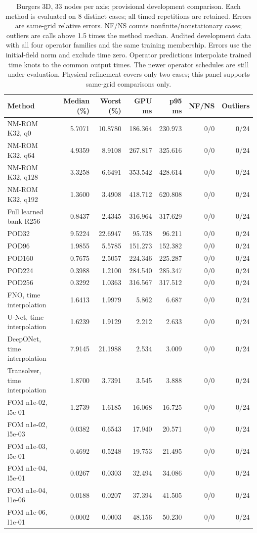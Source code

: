 \begin{table}[htbp]
\centering
\small
\setlength{\tabcolsep}{3pt}
\begin{tabular}{lrrrrrr}
\toprule
Method & Median (\%) & Worst (\%) & GPU ms & p95 ms & NF/NS & Outliers \\
\midrule
NM-ROM K32, q0 & 5.7071 & 10.8780 & 186.364 & 230.973 & 0/0 & 0/24 \\
NM-ROM K32, q64 & 4.9359 & 8.9108 & 267.817 & 325.616 & 0/0 & 0/24 \\
NM-ROM K32, q128 & 3.3258 & 6.6491 & 353.542 & 428.614 & 0/0 & 0/24 \\
NM-ROM K32, q192 & 1.3600 & 3.4908 & 418.712 & 620.808 & 0/0 & 0/24 \\
Full learned bank R256 & 0.8437 & 2.4345 & 316.964 & 317.629 & 0/0 & 0/24 \\
POD32 & 9.5224 & 22.6947 & 95.738 & 96.211 & 0/0 & 0/24 \\
POD96 & 1.9855 & 5.5785 & 151.273 & 152.382 & 0/0 & 0/24 \\
POD160 & 0.7675 & 2.5057 & 224.346 & 225.287 & 0/0 & 0/24 \\
POD224 & 0.3988 & 1.2100 & 284.540 & 285.347 & 0/0 & 0/24 \\
POD256 & 0.3292 & 1.0363 & 316.567 & 317.512 & 0/0 & 0/24 \\
FNO, time interpolation & 1.6413 & 1.9979 & 5.862 & 6.687 & 0/0 & 0/24 \\
U-Net, time interpolation & 1.6239 & 1.9129 & 2.212 & 2.633 & 0/0 & 0/24 \\
DeepONet, time interpolation & 7.9145 & 21.1988 & 2.534 & 3.009 & 0/0 & 0/24 \\
Transolver, time interpolation & 1.8700 & 3.7391 & 3.545 & 3.888 & 0/0 & 0/24 \\
FOM n1e-02, l5e-01 & 1.2739 & 1.6185 & 16.068 & 16.725 & 0/0 & 0/24 \\
FOM n1e-02, l5e-03 & 0.0382 & 0.6543 & 17.940 & 20.571 & 0/0 & 0/24 \\
FOM n1e-03, l5e-01 & 0.4692 & 0.5248 & 19.753 & 21.495 & 0/0 & 0/24 \\
FOM n1e-04, l5e-01 & 0.0267 & 0.0303 & 32.494 & 34.086 & 0/0 & 0/24 \\
FOM n1e-04, l1e-06 & 0.0188 & 0.0207 & 37.394 & 41.505 & 0/0 & 0/24 \\
FOM n1e-06, l1e-01 & 0.0002 & 0.0003 & 48.156 & 50.230 & 0/0 & 0/24 \\
\bottomrule
\end{tabular}
\caption{Burgers 3D, 33 nodes per axis; provisional development comparison. Each method is evaluated on 8 distinct cases; all timed repetitions are retained. Errors are same-grid relative errors. NF/NS counts nonfinite/nonstationary cases; outliers are calls above 1.5 times the method median. Audited development data with all four operator families and the same training membership. Errors use the initial-field norm and exclude time zero. Operator predictions interpolate trained time knots to the common output times. The newer operator schedules are still under evaluation. Physical refinement covers only two cases; this panel supports same-grid comparisons only.}
\label{tab:burgers3d-b3d004-n33}
\end{table}
